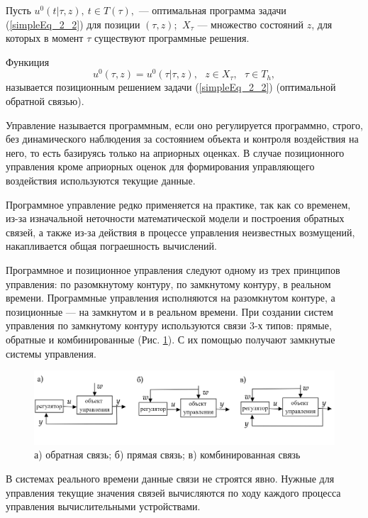Пусть $ u^0(t|\tau, z),~ t \in T(\tau), $ --- оптимальная программа задачи (\ref{simpleEq_2_2}) для позиции $(\tau, z)$; $~X_\tau$ --- множество состояний $z$, для которых в момент $\tau$ существуют программные решения.


\begin{definition}   Функиция
\[ u^0(\tau, z) = u^0(\tau|\tau, z),~~~ z \in X_\tau,~~~ \tau \in T_h,\]
называется позиционным решением задачи (\ref{simpleEq_2_2}) (оптимальной обратной связью).
\end{definition}
 

Управление называется программным, если оно регулируется программно, строго, без динамического наблюдения за состоянием объекта и контроля воздействия на него, то есть базируясь только на априорных оценках. В случае позиционного управления кроме априорных оценок для формирования управляющего воздействия используются текущие данные.
	
	
Программное управление редко применяется на практике, так как со временем, из-за изначальной неточности математической модели и построения обратных связей, а также из-за действия в процессе управления неизвестных возмущений, накапливается общая пограешность вычислений. 


Программное и позиционное управления следуют одному из трех принципов управления: по разомкнутому контуру, по замкнутому контуру, в реальном времени. Программные управления исполняются на разомкнутом контуре, а позиционные --- на замкнутом и в реальном времени. При создании систем управления по замкнутому контуру используются связи 3-х типов: прямые, обратные и комбинированные (Рис. \ref{fig:1_2_1}). С их помощью получают замкнутые системы управления.


\begin{figure}[h]
	\includegraphics[width=\linewidth]{1_2_1.png}
  	\caption{а) обратная связь; б) прямая связь; в) комбинированная связь}
  	\label{fig:1_2_1}
\end{figure}


В системах реального времени данные связи не строятся явно. Нужные для управления текущие значения связей вычисляются по ходу каждого процесса управления вычислительными устройствами.


